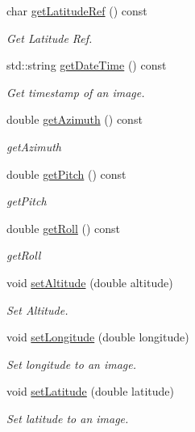 \begin{DoxyCompactItemize}
char \hyperlink{classwtl_1_1_g_p_s_info_a661af4256c1e095928ee0ad5181375de}{get\+Latitude\+Ref} () const
\begin{DoxyCompactList}\small\item\em Get Latitude Ref. \end{DoxyCompactList}\item 
std\+::string \hyperlink{classwtl_1_1_g_p_s_info_adc9b4d01e46a237066434494337e0925}{get\+Date\+Time} () const
\begin{DoxyCompactList}\small\item\em Get timestamp of an image. \end{DoxyCompactList}\item 
double \hyperlink{classwtl_1_1_g_p_s_info_abe29aaf63a203760e8f3f49473eaa19a}{get\+Azimuth} () const
\begin{DoxyCompactList}\small\item\em get\+Azimuth \end{DoxyCompactList}\item 
double \hyperlink{classwtl_1_1_g_p_s_info_abfd7decf737bf895bd276f1044295d7f}{get\+Pitch} () const
\begin{DoxyCompactList}\small\item\em get\+Pitch \end{DoxyCompactList}\item 
double \hyperlink{classwtl_1_1_g_p_s_info_aa1080cd1d995f53311b974002bf72997}{get\+Roll} () const
\begin{DoxyCompactList}\small\item\em get\+Roll \end{DoxyCompactList}\item 
void \hyperlink{classwtl_1_1_g_p_s_info_a560c21c3793312408ad85e40c16d9e4a}{set\+Altitude} (double altitude)
\begin{DoxyCompactList}\small\item\em Set Altitude. \end{DoxyCompactList}\item 
void \hyperlink{classwtl_1_1_g_p_s_info_af0e6a11ab111af087a8b58546040db29}{set\+Longitude} (double longitude)
\begin{DoxyCompactList}\small\item\em Set longitude to an image. \end{DoxyCompactList}\item 
void \hyperlink{classwtl_1_1_g_p_s_info_a5cda2231162f5619bb6b688d70b568ad}{set\+Latitude} (double latitude)
\begin{DoxyCompactList}\small\item\em Set latitude to an image. \end{DoxyCompactList}\item 

\end{DoxyCompactItemize}
